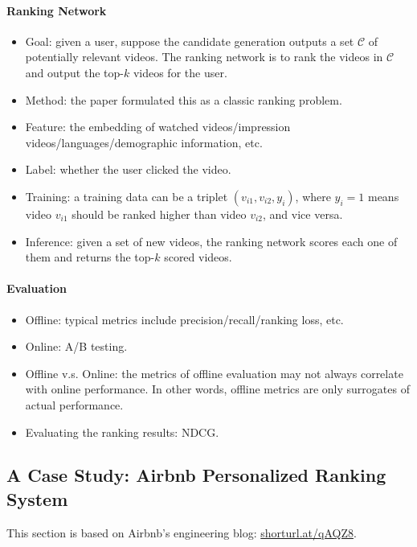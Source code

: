     \paragraph{Ranking Network}
        \begin{itemize}
            \item Goal: given a user, suppose the candidate generation outputs a set $\mathcal{C}$ of potentially relevant videos.
            The ranking network is to rank the videos in $\mathcal{C}$ and output the top-$k$ videos for the user.
            \item Method: the paper formulated this as a classic ranking problem.
            \item Feature: the embedding of watched videos/impression videos/languages/demographic information, etc.
            \item Label: whether the user clicked the video.
            \item Training: a training data can be a triplet $(v_{i1}, v_{i2}, y_i)$, where $y_i=1$ means video $v_{i1}$ should be ranked higher than video $v_{i2}$, and vice versa.
            \item Inference: given a set of new videos, the ranking network scores each one of them and returns the top-$k$ scored videos.
        \end{itemize}
    \paragraph{Evaluation}
        \begin{itemize}
            \item Offline: typical metrics include precision/recall/ranking loss, etc.
            \item Online: A/B testing.
            \item Offline v.s. Online: the metrics of offline evaluation may not always correlate with online performance.
            In other words, offline metrics are only surrogates of actual performance.
            \item Evaluating the ranking results: NDCG.
        \end{itemize}
        
        
\subsection{A Case Study: Airbnb Personalized Ranking System}
    This section is based on Airbnb's engineering blog: \url{shorturl.at/qAQZ8}.





